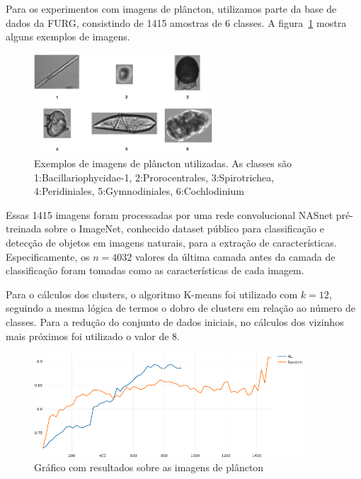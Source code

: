 Para os experimentos com imagens de plâncton, utilizamos parte da base de dados da FURG, consistindo de 1415 amostras de 6 classes. A figura~\ref{fig:Plancton_Exemplos} mostra alguns exemplos de imagens.


\begin{figure}
  \centering
  \includegraphics[width=0.6\textwidth]{figures/Plancton_Exemplos.png}
  \caption{Exemplos de imagens de plâncton utilizadas. As classes são 1:Bacillariophycidae-1, 2:Prorocentrales, 3:Spirotrichea, 4:Peridiniales, 5:Gymnodiniales, 6:Cochlodinium}
  \label{fig:Plancton_Exemplos}
\end{figure}

Essas 1415 imagens foram processadas por uma rede convolucional NASnet pré-treinada sobre o ImageNet, conhecido dataset público para classificação e detecção de objetos em imagens naturais, para a extração de características. Especificamente, os $n=4032$ valores da última camada antes da camada de classificação foram tomadas como as características de cada imagem.

Para o cálculos dos clusters, o algoritmo K-means foi utilizado com $k=12$, seguindo a mesma lógica de termos o dobro de clusters em relação ao número de classes. Para a redução do conjunto de dados iniciais, no cálculos dos vizinhos mais próximos foi utilizado o valor de 8. 


\begin{figure}
  \centering
  \includegraphics[width=0.9\textwidth]{figures/grafico_exemplo_plancton.png}
  \caption{Gráfico com resultados sobre as imagens de plâncton}
  \label{fig:grafico_exemplo_plancton}
\end{figure}

